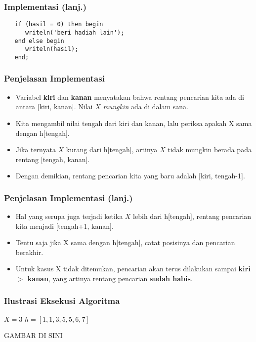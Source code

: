 \documentclass{beamer}
\begin{document}
\begin{frame}[fragile]
\frametitle{Implementasi (lanj.)}
\begin{lstlisting}
   if (hasil = 0) then begin
      writeln('beri hadiah lain');
   end else begin
      writeln(hasil);
   end;
\end{lstlisting}
\end{frame}

\begin{frame}
\frametitle{Penjelasan Implementasi}
\begin{itemize}
	\item Variabel \textbf{kiri} dan \textbf{kanan} menyatakan bahwa rentang pencarian kita ada di antara [kiri, kanan]. Nilai $X$ \textit{mungkin} ada di dalam sana.
	\item Kita mengambil nilai tengah dari kiri dan kanan, lalu periksa apakah X sama dengan h[tengah].
	\item Jika ternyata $X$ kurang dari h[tengah], artinya $X$ tidak mungkin berada pada rentang [tengah, kanan].
	\item Dengan demikian, rentang pencarian kita yang baru adalah [kiri, tengah-1].
\end{itemize}
\end{frame}

\begin{frame}
\frametitle{Penjelasan Implementasi (lanj.)}
\begin{itemize}
	\item Hal yang serupa juga terjadi ketika $X$ lebih dari h[tengah], rentang pencarian kita menjadi [tengah+1, kanan].
	\item Tentu saja jika X sama dengan h[tengah], catat posisinya dan pencarian berakhir.
	\item Untuk kasus X tidak ditemukan, pencarian akan terus dilakukan sampai \textbf{kiri $>$ kanan}, yang artinya rentang pencarian \textbf{sudah habis}.
\end{itemize}
\end{frame}

\begin{frame}
\frametitle{Ilustrasi Eksekusi Algoritma}
$X=3$ \hfil $h=[1, 1, 3, 5, 5, 6, 7]$

GAMBAR DI SINI
\end{frame}
\end{document}
